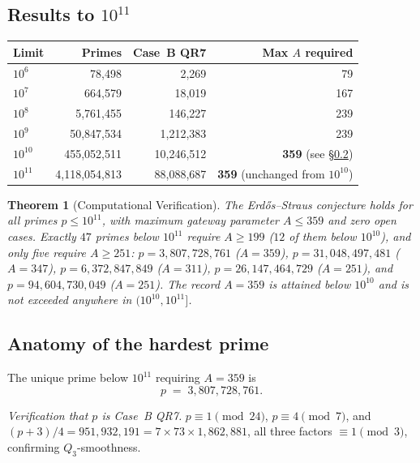 \documentclass[12pt]{amsart}
\newtheorem{theorem}{Theorem}[section]
\theoremstyle{definition}
\theoremstyle{remark}
\begin{document}
\subsection{Results to $10^{11}$}

\begin{center}
\begin{tabular}{lrrr}
\toprule
Limit & Primes & Case~B QR7 & Max $A$ required \\
\midrule
$10^6$  &    78{,}498  &    2{,}269 & 79 \\
$10^7$  &   664{,}579  &   18{,}019 & 167 \\
$10^8$  & 5{,}761{,}455 &  146{,}227 & 239 \\
$10^9$  & 50{,}847{,}534 & 1{,}212{,}383 & 239 \\
$10^{10}$ & 455{,}052{,}511 & 10{,}246{,}512 & \textbf{359} (see \S\ref{subsec:a359}) \\
$10^{11}$ & 4{,}118{,}054{,}813 & 88{,}088{,}687 & \textbf{359} (unchanged from $10^{10}$) \\
\bottomrule
\end{tabular}
\end{center}

\begin{theorem}[Computational Verification]\label{thm:gpu}
The Erd\H{o}s--Straus conjecture holds for all primes $p \le 10^{11}$,
with maximum gateway parameter $A \le 359$ and zero open cases.
Exactly $47$ primes below $10^{11}$ require $A \ge 199$ ($12$ of them
below $10^{10}$), and only five require $A \ge 251$:
$p = 3{,}807{,}728{,}761$ ($A = 359$),
$p = 31{,}048{,}497{,}481$ ($A = 347$),
$p = 6{,}372{,}847{,}849$ ($A = 311$),
$p = 26{,}147{,}464{,}729$ ($A = 251$), and
$p = 94{,}604{,}730{,}049$ ($A = 251$).
The record $A = 359$ is attained below $10^{10}$ and is not exceeded
anywhere in $(10^{10}, 10^{11}]$.
\end{theorem}

\subsection{Anatomy of the hardest prime}\label{subsec:a359}

The unique prime below $10^{11}$ requiring $A = 359$ is
\[
  p \;=\; 3{,}807{,}728{,}761.
\]

\medskip
\noindent\textit{Verification that $p$ is Case~B QR7.}
$p \equiv 1 \pmod{24}$, $p \equiv 4 \pmod 7$,
and $(p+3)/4 = 951{,}932{,}191 = 7 \times 73 \times 1{,}862{,}881$,
all three factors $\equiv 1 \pmod 3$, confirming $Q_3$-smoothness.
\end{document}
